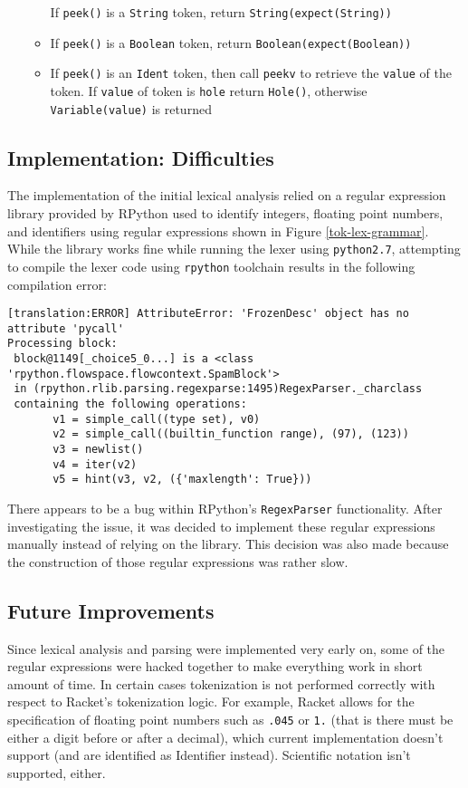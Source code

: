 \begin{itemize}
\begin{itemize}
		If \texttt{peek()} is a \texttt{String} token, return \texttt{String(expect(String))}
	\item
		If \texttt{peek()} is a \texttt{Boolean} token, return \texttt{Boolean(expect(Boolean))}
	\item

		If \texttt{peek()} is an \texttt{Ident} token, then call \texttt{peekv} to retrieve the \texttt{value} of the token. If \texttt{value} of token is \texttt{hole} return \texttt{Hole()}, otherwise \texttt{Variable(value)} is returned
	\end{itemize}
	

\end{itemize}

\subsection{Implementation: Difficulties}
The implementation of the initial lexical analysis relied on a regular expression library provided by RPython used to identify integers, floating point numbers, and identifiers using regular expressions shown in Figure \ref{tok-lex-grammar}. While the library works fine while running the lexer using \texttt{python2.7}, attempting to compile the lexer code using \texttt{rpython} toolchain results in the following compilation error:

\begin{verbatim}
[translation:ERROR] AttributeError: 'FrozenDesc' object has no attribute 'pycall'
Processing block:
 block@1149[_choice5_0...] is a <class 'rpython.flowspace.flowcontext.SpamBlock'> 
 in (rpython.rlib.parsing.regexparse:1495)RegexParser._charclass 
 containing the following operations: 
       v1 = simple_call((type set), v0) 
       v2 = simple_call((builtin_function range), (97), (123)) 
       v3 = newlist() 
       v4 = iter(v2) 
       v5 = hint(v3, v2, ({'maxlength': True})) 
\end{verbatim}

There appears to be a bug within RPython's \texttt{RegexParser} functionality. After investigating the issue, it was decided to implement these regular expressions manually instead of relying on the library. This decision was also made because the construction of those regular expressions was rather slow.

\subsection{Future Improvements}

Since lexical analysis and parsing were implemented very early on, some of the regular expressions were hacked together to make everything work in short amount of time. In certain cases tokenization is not performed correctly with respect to Racket's tokenization logic. For example, Racket allows for the specification of floating point numbers such as \texttt{.045} or \texttt{1.} (that is there must be either a digit before or after a decimal), which current implementation doesn't support (and are identified as Identifier instead). Scientific notation isn't supported, either.
